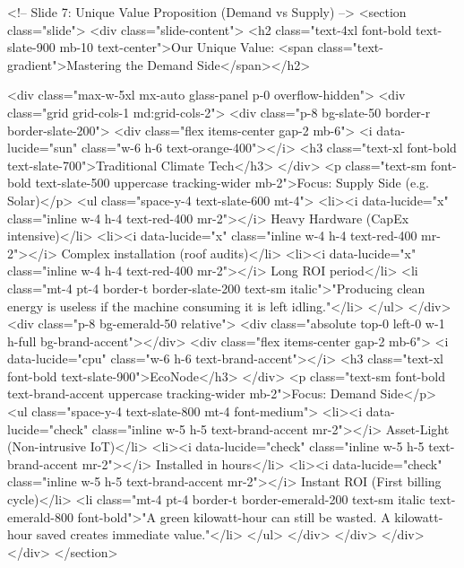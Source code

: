         <!-- Slide 7: Unique Value Proposition (Demand vs Supply) -->
        <section class="slide">
            <div class="slide-content">
                <h2 class="text-4xl font-bold text-slate-900 mb-10 text-center">Our Unique Value: <span class="text-gradient">Mastering the Demand Side</span></h2>
                
                <div class="max-w-5xl mx-auto glass-panel p-0 overflow-hidden">
                    <div class="grid grid-cols-1 md:grid-cols-2">
                        <div class="p-8 bg-slate-50 border-r border-slate-200">
                            <div class="flex items-center gap-2 mb-6">
                                <i data-lucide="sun" class="w-6 h-6 text-orange-400"></i>
                                <h3 class="text-xl font-bold text-slate-700">Traditional Climate Tech</h3>
                            </div>
                            <p class="text-sm font-bold text-slate-500 uppercase tracking-wider mb-2">Focus: Supply Side (e.g. Solar)</p>
                            <ul class="space-y-4 text-slate-600 mt-4">
                                <li><i data-lucide="x" class="inline w-4 h-4 text-red-400 mr-2"></i> Heavy Hardware (CapEx intensive)</li>
                                <li><i data-lucide="x" class="inline w-4 h-4 text-red-400 mr-2"></i> Complex installation (roof audits)</li>
                                <li><i data-lucide="x" class="inline w-4 h-4 text-red-400 mr-2"></i> Long ROI period</li>
                                <li class="mt-4 pt-4 border-t border-slate-200 text-sm italic">"Producing clean energy is useless if the machine consuming it is left idling."</li>
                            </ul>
                        </div>
                        <div class="p-8 bg-emerald-50 relative">
                            <div class="absolute top-0 left-0 w-1 h-full bg-brand-accent"></div>
                            <div class="flex items-center gap-2 mb-6">
                                <i data-lucide="cpu" class="w-6 h-6 text-brand-accent"></i>
                                <h3 class="text-xl font-bold text-slate-900">EcoNode</h3>
                            </div>
                            <p class="text-sm font-bold text-brand-accent uppercase tracking-wider mb-2">Focus: Demand Side</p>
                            <ul class="space-y-4 text-slate-800 mt-4 font-medium">
                                <li><i data-lucide="check" class="inline w-5 h-5 text-brand-accent mr-2"></i> Asset-Light (Non-intrusive IoT)</li>
                                <li><i data-lucide="check" class="inline w-5 h-5 text-brand-accent mr-2"></i> Installed in hours</li>
                                <li><i data-lucide="check" class="inline w-5 h-5 text-brand-accent mr-2"></i> Instant ROI (First billing cycle)</li>
                                <li class="mt-4 pt-4 border-t border-emerald-200 text-sm italic text-emerald-800 font-bold">"A green kilowatt-hour can still be wasted. A kilowatt-hour saved creates immediate value."</li>
                            </ul>
                        </div>
                    </div>
                </div>
            </div>
        </section>

